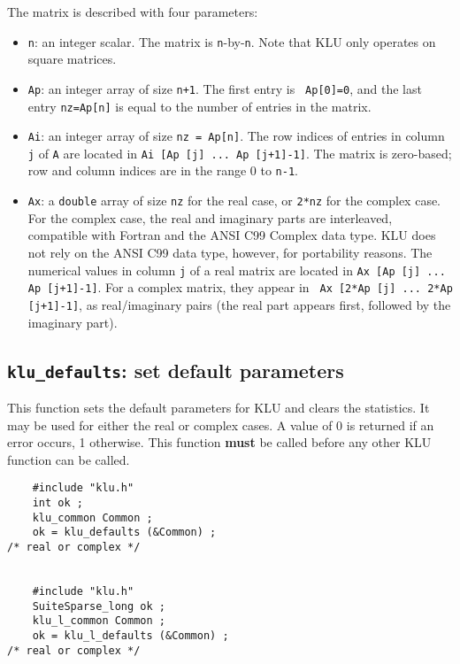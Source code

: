 \documentclass[11pt]{article}
\begin{document}
The matrix is described with four parameters:

\begin{itemize}
\item {\tt n}: an integer scalar.  The matrix is {\tt n}-by-{\tt n}.  Note that
KLU only operates on square matrices.

\item {\tt Ap}: an integer array of size {\tt n+1}.  The first entry is {\tt
Ap[0]=0}, and the last entry {\tt nz=Ap[n]} is equal to the number of entries
in the matrix.

\item {\tt Ai}: an integer array of size {\tt nz = Ap[n]}.
The row indices of entries in column {\tt j} of {\tt A} are located in
{\tt Ai [Ap [j] ... Ap [j+1]-1]}.  The matrix is zero-based; row and column
indices are in the range 0 to {\tt n-1}.

\item {\tt Ax}: a {\tt double} array of size {\tt nz} for the real case, or
{\tt 2*nz} for the complex case.  For the complex case, the real and imaginary
parts are interleaved, compatible with Fortran and the ANSI C99 Complex data
type.  KLU does not rely on the ANSI C99 data type, however, for portability
reasons.  The numerical values in column {\tt j} of a real matrix are located
in {\tt Ax [Ap [j] ... Ap [j+1]-1]}.  For a complex matrix, they appear in {\tt
Ax [2*Ap [j] ... 2*Ap [j+1]-1]}, as real/imaginary pairs (the real part appears
first, followed by the imaginary part).

\end{itemize}

\subsection{{\tt klu\_defaults}: set default parameters}

This function sets the default parameters for KLU and clears the statistics.
It may be used for either the real or complex cases.  A value of 0 is returned
if an error occurs, 1 otherwise.  This function {\bf must} be called before
any other KLU function can be called.

{\footnotesize
\begin{verbatim}
    #include "klu.h"
    int ok ;
    klu_common Common ;
    ok = klu_defaults (&Common) ;                                             /* real or complex */


    #include "klu.h"
    SuiteSparse_long ok ;
    klu_l_common Common ;
    ok = klu_l_defaults (&Common) ;                                           /* real or complex */
\end{verbatim}
}
\end{document}
